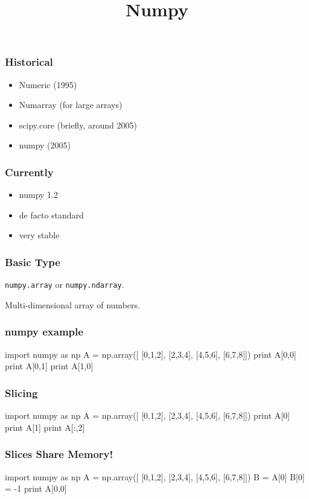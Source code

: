 
\title{Numpy}

\frame{\maketitle}

\begin{frame}[fragile]
\frametitle{Historical}

\begin{itemize}
\item Numeric (1995)
\item Numarray (for large arrays)
\item scipy.core (briefly, around 2005)
\item numpy (2005)
\end{itemize}
\end{frame}

\begin{frame}[fragile]
\frametitle{Currently}
\begin{itemize}
\item numpy 1.2
\item \alert{de facto} standard
\item very stable 
\end{itemize}
\end{frame}

\begin{frame}[fragile]
\frametitle{Basic Type}

\lstinline{numpy.array} or \lstinline{numpy.ndarray}.

\bigsip
Multi-dimensional array of numbers.

\end{frame}

\begin{frame}[fragile]
\frametitle{numpy example}

\begin{python}
import numpy as np
A = np.array([
    [0,1,2],
    [2,3,4],
    [4,5,6],
    [6,7,8]])
print A[0,0]
print A[0,1]
print A[1,0]
\end{python}

\end{frame}

\begin{frame}[fragile]
\frametitle{Slicing}

\begin{python}
import numpy as np
A = np.array([
    [0,1,2],
    [2,3,4],
    [4,5,6],
    [6,7,8]])
print A[0]
print A[1]
print A[:,2]
\end{python}
\end{frame}

\begin{frame}[fragile]
\frametitle{Slices Share Memory!}
\begin{python}
import numpy as np
A = np.array([
    [0,1,2],
    [2,3,4],
    [4,5,6],
    [6,7,8]])
B = A[0]
B[0] = -1
print A[0,0]
\end{python}

\end{frame}


